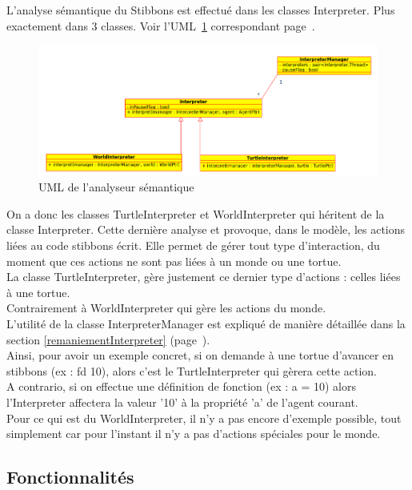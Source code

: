L'analyse sémantique du Stibbons est effectué dans les classes Interpreter. Plus exactement dans 3 classes. Voir l'UML~\ref{interpreterUML} correspondant page~\pageref{interpreterUML}.\\
\begin{figure}[h]
\caption{\label{interpreterUML} UML de l'analyseur sémantique}
\includegraphics[scale=0.5]{doc/report/uml/interpreterUML.png}
\end{figure}

On a donc les classes TurtleInterpreter et WorldInterpreter qui héritent de la classe Interpreter. Cette dernière analyse et provoque, dans le modèle, les actions liées au code stibbons écrit. Elle permet de gérer tout type d'interaction, du moment que ces actions ne sont pas liées à un monde ou une tortue.\\
La classe TurtleInterpreter, gère justement ce dernier type d'actions : celles liées à une tortue.\\
Contrairement à WorldInterpreter qui gère les actions du monde.\\

L'utilité de la classe InterpreterManager est expliqué de manière détaillée dans la section \ref{remaniementInterpreter} (page~\pageref{remaniementInterpreter}).\\

Ainsi, pour avoir un exemple concret, si on demande à une tortue d'avancer en stibbons (ex : fd 10), alors c'est le TurtleInterpreter qui gèrera cette action.\\
A contrario, si on effectue une définition de fonction (ex : a = 10) alors l'Interpreter affectera la valeur '10' à la propriété 'a' de l'agent courant.\\
Pour ce qui est du WorldInterpreter, il n'y a pas encore d'exemple possible, tout simplement car pour l'instant il n'y a pas d'actions spéciales pour le monde.

\subsection{Fonctionnalités}

